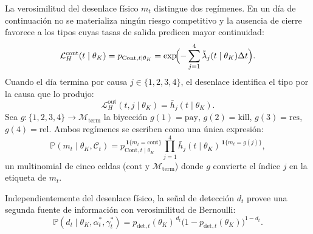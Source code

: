 \documentclass[review,authoryear,12pt]{elsarticle}
\theoremstyle{plain}
\theoremstyle{definition}
\newcommand{\Prob}{\mathbb{P}}
\newcommand{\1}{\mathbf{1}}
\begin{document}
La verosimilitud del desenlace físico $m_t$ distingue dos regímenes. En un día de continuación no se materializa ningún riesgo competitivo y la ausencia de cierre favorece a los tipos cuyas tasas de salida predicen mayor continuidad:
\begin{equation}
\mathcal{L}_H^{\mathrm{cont}}(t\mid\theta_K)=p_{\mathrm{Cont},t\mid\theta_K}=\exp\!\Bigl(-\sum_{j=1}^{4}\tilde{\lambda}_j(t\mid\theta_K)\Delta t\Bigr).
\label{eq:LH-cont}
\end{equation}
Cuando el día termina por causa $j\in\{1,2,3,4\}$, el desenlace identifica el tipo por la causa que lo produjo:
\begin{equation}
\mathcal{L}_H^{\mathrm{out}}(t,j\mid\theta_K)=\bar h_{j}(t\mid\theta_K).
\label{eq:LH-out}
\end{equation}
Sea $g:\{1,2,3,4\}\to\mathcal{M}_{\mathrm{term}}$ la biyección $g(1)=\mathrm{pay}$, $g(2)=\mathrm{kill}$, $g(3)=\mathrm{res}$, $g(4)=\mathrm{rel}$. Ambos regímenes se escriben como una única expresión:
\begin{equation}
\Prob(m_t\mid\theta_K,\mathcal{C}_t)=p_{\mathrm{Cont},t\mid\theta_K}^{\,\mathbf{1}\{m_t=\mathrm{cont}\}}\prod_{j=1}^{4}\bar h_j(t\mid\theta_K)^{\,\mathbf{1}\{m_t=g(j)\}},
\label{eq:LH-compacta}
\end{equation}
un multinomial de cinco celdas ($\mathrm{cont}$ y $\mathcal{M}_{\mathrm{term}}$) donde $g$ convierte el índice $j$ en la etiqueta de $m_t$.

Independientemente del desenlace físico, la señal de detección $d_t$ provee una segunda fuente de información con verosimilitud de Bernoulli:
\begin{equation}
\Prob(d_t\mid\theta_K,\alpha_t^\ast,\gamma_t^\ast)=p_{\mathrm{det},t}(\theta_K)^{\,d_t}\bigl(1-p_{\mathrm{det},t}(\theta_K)\bigr)^{1-d_t}.
\label{eq:Ld-bernoulli}
\end{equation}
\end{document}
